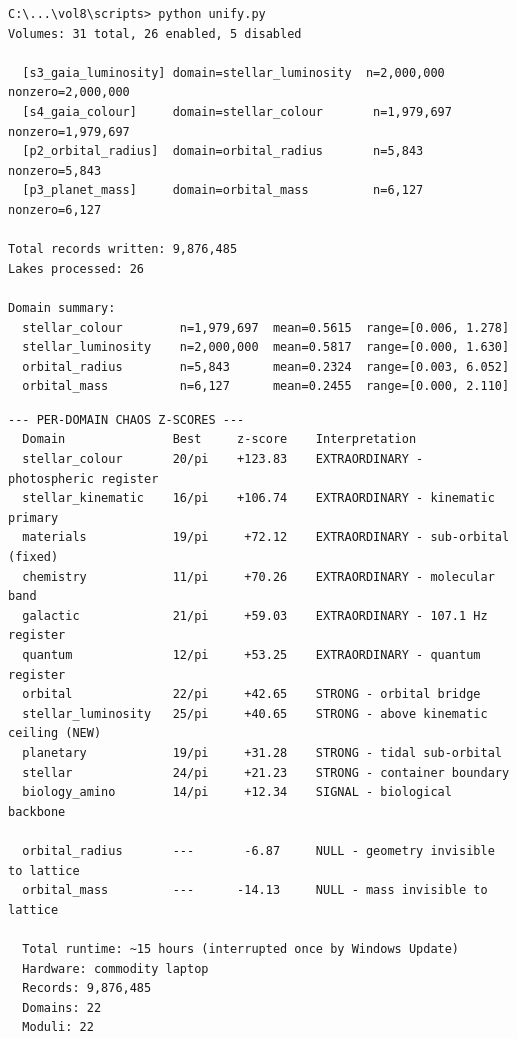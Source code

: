 \documentclass[11pt, letterpaper, openany]{book}
\begin{document}
\begin{lstlisting}[style=terminal]
C:\...\vol8\scripts> python unify.py
Volumes: 31 total, 26 enabled, 5 disabled

  [s3_gaia_luminosity] domain=stellar_luminosity  n=2,000,000  nonzero=2,000,000
  [s4_gaia_colour]     domain=stellar_colour       n=1,979,697  nonzero=1,979,697
  [p2_orbital_radius]  domain=orbital_radius       n=5,843      nonzero=5,843
  [p3_planet_mass]     domain=orbital_mass         n=6,127      nonzero=6,127

Total records written: 9,876,485
Lakes processed: 26

Domain summary:
  stellar_colour        n=1,979,697  mean=0.5615  range=[0.006, 1.278]
  stellar_luminosity    n=2,000,000  mean=0.5817  range=[0.000, 1.630]
  orbital_radius        n=5,843      mean=0.2324  range=[0.003, 6.052]
  orbital_mass          n=6,127      mean=0.2455  range=[0.000, 2.110]
\end{lstlisting}

\begin{lstlisting}[style=terminal]
--- PER-DOMAIN CHAOS Z-SCORES ---
  Domain               Best     z-score    Interpretation
  stellar_colour       20/pi    +123.83    EXTRAORDINARY - photospheric register
  stellar_kinematic    16/pi    +106.74    EXTRAORDINARY - kinematic primary
  materials            19/pi     +72.12    EXTRAORDINARY - sub-orbital (fixed)
  chemistry            11/pi     +70.26    EXTRAORDINARY - molecular band
  galactic             21/pi     +59.03    EXTRAORDINARY - 107.1 Hz register
  quantum              12/pi     +53.25    EXTRAORDINARY - quantum register
  orbital              22/pi     +42.65    STRONG - orbital bridge
  stellar_luminosity   25/pi     +40.65    STRONG - above kinematic ceiling (NEW)
  planetary            19/pi     +31.28    STRONG - tidal sub-orbital
  stellar              24/pi     +21.23    STRONG - container boundary
  biology_amino        14/pi     +12.34    SIGNAL - biological backbone

  orbital_radius       ---       -6.87     NULL - geometry invisible to lattice
  orbital_mass         ---      -14.13     NULL - mass invisible to lattice

  Total runtime: ~15 hours (interrupted once by Windows Update)
  Hardware: commodity laptop
  Records: 9,876,485
  Domains: 22
  Moduli: 22
\end{lstlisting}

\clearpage

\end{document}
